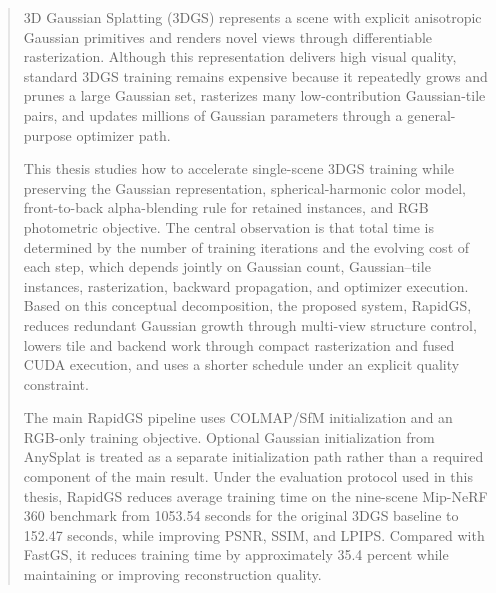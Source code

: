 \begin{abstract}

3D Gaussian Splatting (3DGS) represents a scene with explicit anisotropic Gaussian primitives and renders novel views through differentiable rasterization. Although this representation delivers high visual quality, standard 3DGS training remains expensive because it repeatedly grows and prunes a large Gaussian set, rasterizes many low-contribution Gaussian-tile pairs, and updates millions of Gaussian parameters through a general-purpose optimizer path.

This thesis studies how to accelerate single-scene 3DGS training while preserving the Gaussian representation, spherical-harmonic color model, front-to-back alpha-blending rule for retained instances, and RGB photometric objective. The central observation is that total time is determined by the number of training iterations and the evolving cost of each step, which depends jointly on Gaussian count, Gaussian--tile instances, rasterization, backward propagation, and optimizer execution. Based on this conceptual decomposition, the proposed system, RapidGS, reduces redundant Gaussian growth through multi-view structure control, lowers tile and backend work through compact rasterization and fused CUDA execution, and uses a shorter schedule under an explicit quality constraint.

The main RapidGS pipeline uses COLMAP/SfM initialization and an RGB-only training objective. Optional Gaussian initialization from AnySplat is treated as a separate initialization path rather than a required component of the main result. Under the evaluation protocol used in this thesis, RapidGS reduces average training time on the nine-scene Mip-NeRF 360 benchmark from 1053.54 seconds for the original 3DGS baseline to 152.47 seconds, while improving PSNR, SSIM, and LPIPS. Compared with FastGS, it reduces training time by approximately 35.4 percent while maintaining or improving reconstruction quality.

\end{abstract}

